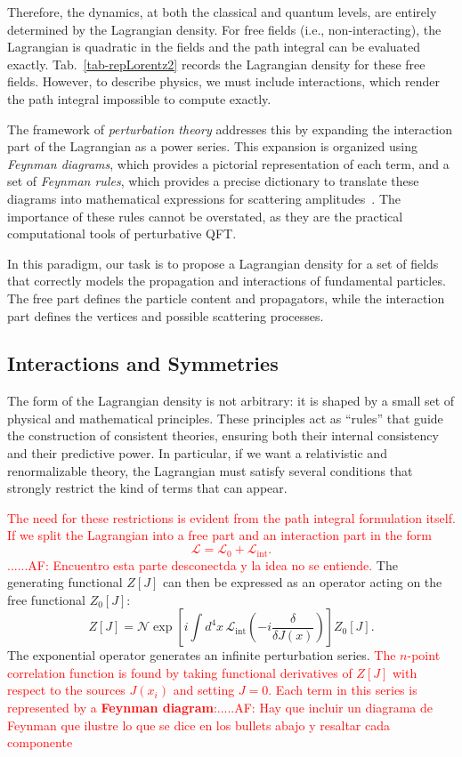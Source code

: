 Therefore, the dynamics, at both the classical and quantum levels, are entirely determined by the Lagrangian density. For free fields (i.e., non-interacting), the Lagrangian is quadratic in the fields and the path integral can be evaluated exactly. Tab.~\ref{tab-repLorentz2} records the Lagrangian density for these free fields. However, to describe physics, we must include interactions, which render the path integral impossible to compute exactly.

The framework of \textit{perturbation theory} addresses this by expanding the interaction part of the Lagrangian as a power series. This expansion is organized using \textit{Feynman diagrams}, which provides a pictorial representation of each term, and a set of \textit{Feynman rules}, which provides a precise dictionary to translate these diagrams into mathematical expressions for scattering amplitudes~\parencite{peskin,Weinberg}. The importance of these rules cannot be overstated, as they are the practical computational tools of perturbative QFT.


In this paradigm, our task is to propose a Lagrangian density for a set of fields that correctly models the propagation and interactions of fundamental particles. The free part defines the particle content and propagators, while the interaction part defines the vertices and possible scattering processes.

\subsection{Interactions and Symmetries} 
The form of the Lagrangian density is not arbitrary: it is shaped by a small set of physical and mathematical principles. These principles act as ``rules'' that guide the construction of consistent theories, ensuring both their internal consistency and their predictive power. In particular, if we want a relativistic and renormalizable theory, the Lagrangian must satisfy several conditions that strongly restrict the kind of terms that can appear.

\textcolor{red}{The need for these restrictions is evident from the path integral formulation itself. If we split the Lagrangian into a free part and an interaction part in the form
\begin{equation}
    \mathcal{L} = \mathcal{L}_0 + \mathcal{L}_{\text{int}}.
\end{equation}
......AF: Encuentro esta parte desconectda y la idea no se entiende.}
The generating functional $Z[J]$ can then be expressed as an operator acting on the free functional $Z_0[J]$:
\begin{equation}
    Z[J] = \mathcal{N} \exp\left[i \int d^4x\, \mathcal{L}_{\text{int}}\left(-i \frac{\delta}{\delta J(x)}\right)\right] Z_0[J].
\end{equation}
The exponential operator generates an infinite perturbation series. \textcolor{red}{The $n$-point correlation function is found by taking functional derivatives of $Z[J]$ with respect to the sources $J(x_i)$ and setting $J=0$. Each term in this series is represented by a \textbf{Feynman diagram}:.....AF: Hay que incluir un diagrama de Feynman que ilustre lo que se dice en los bullets abajo y resaltar cada componente}

